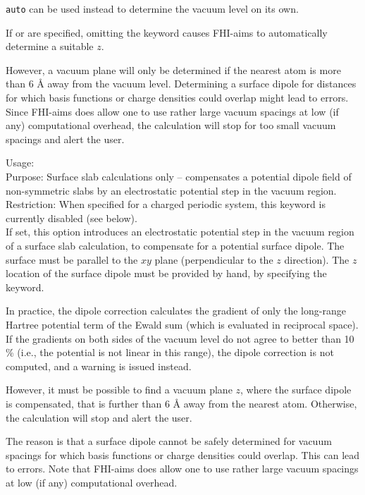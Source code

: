  \texttt{auto} can be used instead to
determine the vacuum level on its own. 

If  or
 are specified, omitting the keyword
 causes FHI-aims to automatically
determine a suitable $z$. 

However, a vacuum plane will only be determined if the nearest
atom is more than 6 {\AA} away from the vacuum level. Determining a
surface dipole for distances for which basis functions or charge
densities could overlap might lead to errors. Since
FHI-aims does allow one to use rather large vacuum spacings at low (if any)
computational overhead, the calculation will stop for too small vacuum
spacings and alert the user. 



{
  \noindent
  Usage:   \\[1.0ex]
  Purpose: Surface slab calculations only -- compensates a potential dipole
  field of non-symmetric slabs by an electrostatic potential step in the
  vacuum region.
  \\[1.0ex]
  Restriction: When specified for a charged periodic system,
    this keyword is currently disabled (see below). \\
}
If set, this option introduces an electrostatic potential step in the vacuum
region of a surface slab calculation, to compensate for a potential surface
dipole. The surface must be parallel to the $xy$ plane (perpendicular to the
$z$ direction). The $z$ location of the surface dipole must be provided by
hand, by specifying the  keyword.

In practice, the dipole correction calculates the gradient of only 
the long-range Hartree potential term of the Ewald sum (which is evaluated in
reciprocal space). If the gradients on both sides of the vacuum level do not
agree to better than 10 \% (i.e., the potential is not linear in this range),
the dipole correction is not computed, and a warning is issued instead.

However, it must be possible to find a vacuum plane $z$, where the
surface dipole is compensated, that is further than 6 {\AA} away from
the nearest atom. Otherwise, the calculation will stop and alert the user.

The reason is that a surface dipole cannot be safely determined for
vacuum spacings for which basis functions or charge densities could
overlap. This can lead to errors. Note that FHI-aims does allow one to use
rather large vacuum spacings at low (if any) computational overhead.

